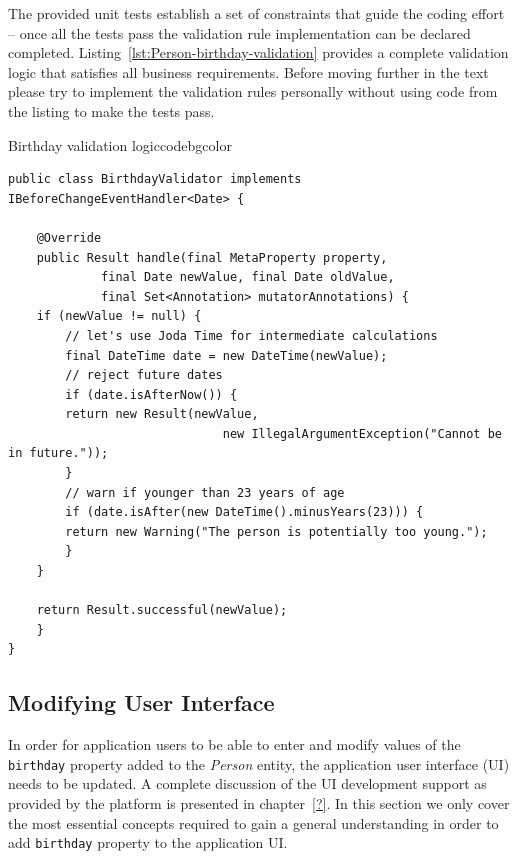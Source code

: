  The provided unit tests establish a set of constraints that guide the coding effort -- once all the tests pass the validation rule implementation can be declared completed.
  Listing~\ref{lst:Person-birthday-validation} provides a complete validation logic that satisfies all business requirements.
  Before moving further in the text please try to implement the validation rules personally without using code from the listing to make the tests pass.


 \begin{code}{Birthday validation logic}{\label{lst:Person-birthday-validation}}{codebgcolor}
    \begin{lstlisting}
public class BirthdayValidator implements IBeforeChangeEventHandler<Date> {

    @Override
    public Result handle(final MetaProperty property, 
			 final Date newValue, final Date oldValue, 
			 final Set<Annotation> mutatorAnnotations) {
	if (newValue != null) {
	    // let's use Joda Time for intermediate calculations
	    final DateTime date = new DateTime(newValue);
	    // reject future dates 
	    if (date.isAfterNow()) {
		return new Result(newValue, 
	                          new IllegalArgumentException("Cannot be in future."));
	    }
	    // warn if younger than 23 years of age 
	    if (date.isAfter(new DateTime().minusYears(23))) {
		return new Warning("The person is potentially too young.");
	    }
	}	
	
	return Result.successful(newValue);
    }
}
    \end{lstlisting}
  \end{code}

\subsection{Modifying User Interface}
  In order for application users to be able to enter and modify values of the \texttt{birthday} property added to the \emph{Person} entity, the application user interface (UI) needs to be updated.
  A complete discussion of the UI development support as provided by the platform is presented in chapter~\ref{?}.
  In this section we only cover the most essential concepts required to gain a general understanding in order to add \texttt{birthday} property to the application UI.

